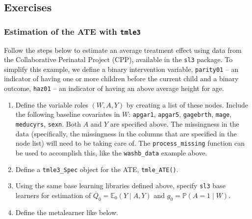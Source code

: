 \documentclass[12pt, krantz2,]{krantz}
\newenvironment{Shaded}{\begin{snugshade}}{\end{snugshade}}
\newcommand{\CommentTok}[1]{\textcolor[rgb]{0.37,0.37,0.37}{\textit{#1}}}
\newcommand{\DataTypeTok}[1]{\textcolor[rgb]{0.27,0.27,0.27}{#1}}
\newcommand{\DecValTok}[1]{\textcolor[rgb]{0.06,0.06,0.06}{#1}}
\newcommand{\KeywordTok}[1]{\textcolor[rgb]{0.27,0.27,0.27}{\textbf{#1}}}
\newcommand{\NormalTok}[1]{#1}
\newcommand{\OperatorTok}[1]{\textcolor[rgb]{0.43,0.43,0.43}{\textbf{#1}}}
\newcommand{\StringTok}[1]{\textcolor[rgb]{0.5,0.5,0.5}{#1}}
\providecommand{\tightlist}{%
  \setlength{\itemsep}{0pt}\setlength{\parskip}{0pt}}
\theoremstyle{definition}
\theoremstyle{definition}
\theoremstyle{definition}
\newcommand{\1}{\mathbbm{1}}
\begin{document}
\hypertarget{exercises-1}{%
\subsection{Exercises}\label{exercises-1}}

\hypertarget{tmle3-ex1}{%
\subsubsection{\texorpdfstring{Estimation of the ATE with \texttt{tmle3}}{Estimation of the ATE with tmle3}}\label{tmle3-ex1}}

Follow the steps below to estimate an average treatment effect using data from
the Collaborative Perinatal Project (CPP), available in the \texttt{sl3} package. To
simplify this example, we define a binary intervention variable, \texttt{parity01} --
an indicator of having one or more children before the current child and a
binary outcome, \texttt{haz01} -- an indicator of having an above average height for
age.

\begin{Shaded}
\end{Shaded}

\begin{enumerate}
\def\labelenumi{\arabic{enumi}.}
\tightlist
\item
  Define the variable roles \((W,A,Y)\) by creating a list of these nodes.
  Include the following baseline covariates in \(W\): \texttt{apgar1}, \texttt{apgar5},
  \texttt{gagebrth}, \texttt{mage}, \texttt{meducyrs}, \texttt{sexn}. Both \(A\) and \(Y\) are specified
  above. The missingness in the data (specifically, the missingness in the
  columns that are specified in the node list) will need to be taking care of.
  The \texttt{process\_missing} function can be used to accomplish this, like the
  \texttt{washb\_data} example above.
\item
  Define a \texttt{tmle3\_Spec} object for the ATE, \texttt{tmle\_ATE()}.
\item
  Using the same base learning libraries defined above, specify \texttt{sl3} base
  learners for estimation of \(\overline{Q}_0 = \mathbb{E}_0(Y \mid A,Y)\) and
  \(g_0 = \mathbb{P}(A = 1 \mid W)\).
\item
  Define the metalearner like below.
\end{enumerate}
\end{document}
